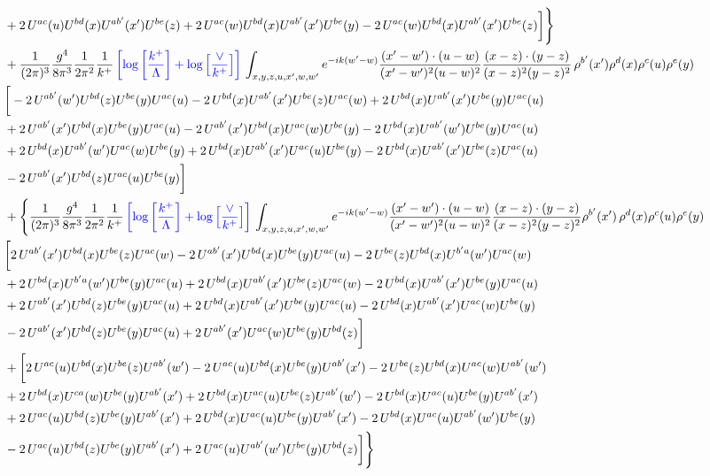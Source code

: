 \documentclass[aps,prd,amsmath,amssymb,nofootinbib]{revtex4-2}
\numberwithin{equation}{section}
\begin{document}
\begin{align}
    & +2\, U^{ac}(u)U^{bd}(x)U^{ab'}(x')U^{be}(z) + 2\,U^{ac}(w)U^{bd}(x)U^{ab'}(x')U^{be}(y)- 2\,U^{ac}(w)U^{bd}(x)U^{ab'}(x')U^{be}(z)\bigg]\Bigg\}\notag \\ & + \frac{1}{(2\pi)^{3}}\frac{g^{4}}{8\pi^{3}}\frac{1}{2\pi^{2}} \frac{1}{k^{+}}\,{\color{blue}\left[\log{\left[\frac{k^{+}}{\Lambda}\right]}+\log{\left[\frac{\vee}{k^{+}}\right]}\right]}\,\int_{x,y,z,u,x^{\prime},w,w^{\prime}}e^{-ik(w^{\prime}-w)}\frac{(x^{\prime}-w^{\prime})\cdot (u-w)}{(x^{\prime}-w^{\prime})^{2} (u-w)^{2}} \frac{(x-z)\cdot (y-z)}{(x-z)^{2}(y-z)^{2}}\,\rho^{b'}(x^{\prime})\rho^{d}(x)\rho^{c}(u)\rho^{e}(y)\notag \\ & \bigg[-2\,U^{ab'}(w')U^{bd}(z)U^{be}(y)U^{ac}(u) - 2\,U^{bd}(x)U^{ab'}(x^{\prime})U^{be}(z)U^{ac}(w)+ 2\,U^{bd}(x)U^{ab'}(x')U^{be}(y)U^{ac}(u)\notag \\ & + 2\, U^{ab'}(x')U^{bd}(x)U^{be}(y)U^{ac}(u) - 2\,U^{ab'}(x')U^{bd}(x)U^{ac}(w)U^{be}(y) - 2\,U^{bd}(x)U^{ab'}(w')U^{be}(y)U^{ac}(u)\notag \\ &  + 2\, U^{bd}(x)U^{ab'}(w')U^{ac}(w)U^{be}(y) +2\, U^{bd}(x)U^{ab'}(x')U^{ac}(u)U^{be}(y) - 2\,U^{bd}(x)U^{ab'}(x')U^{be}(z)U^{ac}(u)\notag \\ &  - 2\, U^{ab'}(x')U^{bd}(z)U^{ac}(u)U^{be}(y)\bigg]\notag \\ & + \Bigg\{\frac{1}{(2\pi)^{3}}\frac{g^{4}}{8\pi^{3}}\frac{1}{2\pi^{2}} \frac{1}{k^{+}}\,{\color{blue}\left[\log{\left[\frac{k^{+}}{\Lambda}\right]}+\log{\left[\frac{\vee}{k^{+}}\right]}\right]}\,\int_{x,y,z,u,x^{\prime},w,w^{\prime}}e^{-ik(w^{\prime}-w)}\frac{(x^{\prime}-w^{\prime})\cdot (u-w)}{(x^{\prime}-w^{\prime})^{2} (u-w)^{2}} \frac{(x-z)\cdot (y-z)}{(x-z)^{2}(y-z)^{2}}\rho^{b'}(x^{\prime})\,\rho^{d}(x)\rho^{c}(u)\rho^{e}(y)\notag \\ & \bigg[2\,U^{ab'}(x')U^{bd}(x)U^{be}(z)U^{ac}(w)-2\,U^{ab'}(x')U^{bd}(x)U^{be}(y)U^{ac}(u)-2\,U^{be}(z)U^{bd}(x)U^{b'a}(w')U^{ac}(w)\notag \\ &+2\,U^{bd}(x)U^{b'a}(w')U^{be}(y)U^{ac}(u) +2\,U^{bd}(x)U^{ab'}(x')U^{be}(z)U^{ac}(w) - 2\,U^{bd}(x)U^{ab'}(x')U^{be}(y)U^{ac}(u)\notag \\ & +2\,U^{ab'}(x')U^{bd}(z)U^{be}(y)U^{ac}(u)+2\,U^{bd}(x)U^{ab'}(x')U^{be}(y)U^{ac}(u) -2\, U^{bd}(x)U^{ab'}(x')U^{ac}(w)U^{be}(y)\notag \\ & -2\,  U^{ab'}(x')U^{bd}(z)U^{be}(y)U^{ac}(u) + 2\, U^{ab'}(x')U^{ac}(w)U^{be}(y)U^{bd}(z)\bigg]\notag \\ & +\bigg[2\,U^{ac}(u)U^{bd}(x)U^{be}(z)U^{ab'}(w') -2\,U^{ac}(u)U^{bd}(x)U^{be}(y)U^{ab'}(x')-2\,U^{be}(z)U^{bd}(x)U^{ac}(w)U^{ab'}(w')\notag \\ & +2\,U^{bd}(x)U^{ca}(w)U^{be}(y)U^{ab'}(x') +2\,U^{bd}(x)U^{ac}(u)U^{be}(z)U^{ab'}(w') -2\,U^{bd}(x)U^{ac}(u)U^{be}(y)U^{ab'}(x')\notag \\  & + 2\,U^{ac}(u)U^{bd}(z)U^{be}(y)U^{ab'}(x')+ 2\,U^{bd}(x)U^{ac}(u)U^{be}(y)U^{ab'}(x') -2\, U^{bd}(x)U^{ac}(u)U^{ab'}(w')U^{be}(y)\notag \\ & 
     -2\, U^{ac}(u)U^{bd}(z)U^{be}(y)U^{ab'}(x')+2\, U^{ac}(u)U^{ab'}(w')U^{be}(y)U^{bd}(z)\bigg]\Bigg\}
\end{align}
\end{document}
